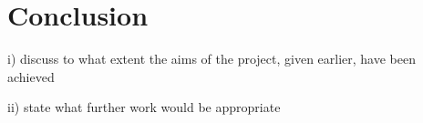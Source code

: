 \section{Conclusion}
i) discuss to what extent the aims of the project, given earlier, have been achieved

ii) state what further work would be appropriate